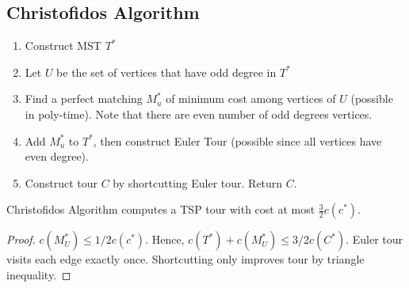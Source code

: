 \subsection{Christofidos Algorithm}

\begin{enumerate}
    \item Construct MST $T^*$
    \item Let $U$ be the set of vertices that have odd degree in $T^*$
    \item Find a perfect matching $M_u^*$ of minimum cost among vertices of $U$ (possible in poly-time). Note that there are even number of odd degrees vertices.
    \item Add $M_u^*$ to $T^*$, then construct Euler Tour (possible since all vertices have even degree).
    \item Construct tour $C$ by shortcutting Euler tour. Return $C$.
\end{enumerate}

\begin{mytheorem}
Christofidos Algorithm computes a TSP tour with cost at most $\frac{3}{2} c(c^*)$.
\end{mytheorem}
\begin{proof}
$c(M_U^*) \le 1/2 c(c^*)$. Hence, $c(T^*) + c(M_U^*) \le 3/2 c(C^*)$.
Euler tour visits each edge exactly once. Shortcutting only improves tour by triangle inequality.
\end{proof}

